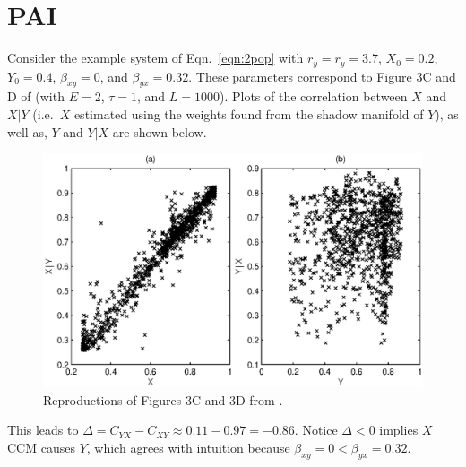 \documentclass[a4paper,11pt,twocolumn]{article}
\begin{document}
\section{PAI}
\label{sec:PAI}
Consider the example system of Eqn.\ \ref{eqn:2pop} with $r_y=r_y=3.7$, $X_0 = 0.2$, $Y_0=0.4$, $\beta_{xy}=0$, and $\beta_{yx}=0.32$.  These parameters correspond to Figure 3C and D of \cite{Sugihara2012} (with $E=2$, $\tau=1$, and $L=1000$).  Plots of the correlation between $X$ and $X|Y$ (i.e.\ $X$ estimated using the weights found from the shadow manifold of $Y$), as well as, $Y$ and $Y|X$ are shown below.
\begin{figure}[ht]
\includegraphics[scale=0.55]{SugFig3CD.eps} 
\caption{Reproductions of Figures 3C and 3D from \cite{Sugihara2012}.}
\label{fig:Sug3CDredo}
\end{figure}
This leads to $\Delta=C_{YX}-C_{XY}\approx 0.11 - 0.97 = -0.86$.  Notice $\Delta<0$ implies $X$ CCM causes $Y$, which agrees with intuition because $\beta_{xy}=0 < \beta_{yx} = 0.32$.
\end{document}
